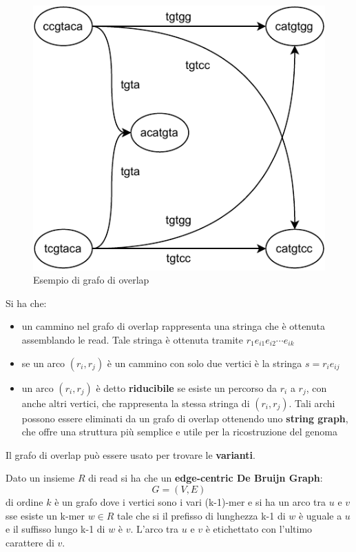 \documentclass[a4paper,12pt, oneside]{book}
\begin{document}
\begin{figure}
    \centering
    \includegraphics[scale = 0.8]{img/olc.pdf}
    \caption{Esempio di grafo di overlap}
  \end{figure}
Si ha che:
\begin{itemize}
  \item un cammino nel grafo di overlap rappresenta una stringa che è ottenuta
  assemblando le read. Tale stringa è ottenuta tramite $r_1e_{i1}e_{i2}\cdots
  e_{ik}$
  \item se un arco $(r_i,r_j)$ è un cammino con solo due vertici è la stringa
  $s=r_ie_{ij}$ 
  \item  un arco $(r_i,r_j)$ è detto \textbf{riducibile} se esiste un
  percorso da $r_i$ a $r_j$, con anche altri vertici, che rappresenta la stessa
  stringa di $(r_i,r_j)$. Tali archi possono essere eliminati da un grafo di
  overlap ottenendo uno \textbf{string graph}, che offre una struttura più
  semplice e utile per la ricostruzione del genoma
\end{itemize}
Il grafo di overlap può essere usato per trovare le \textbf{varianti}.
\begin{definizione}
  Dato un insieme $R$ di read si ha che un \textbf{edge-centric De Bruijn
    Graph}:
  \[G=(V,E)\]
  di ordine $k$ è un grafo dove i vertici sono i vari (k-1)-mer e si ha un arco
  tra $u$ e $v$ sse esiste un k-mer $w\in R$ tale che si il prefisso di
  lunghezza k-1 di $w$ è uguale a $u$ e il suffisso lungo k-1 di $w$ è
  $v$. L'arco tra $u$ e $v$ è etichettato con l'ultimo carattere di $v$.
  
\end{definizione}
\end{document}
